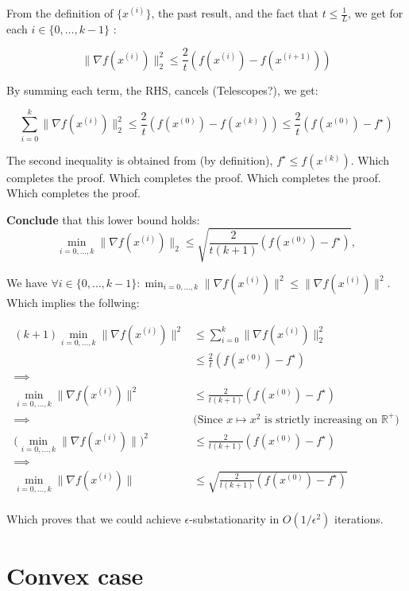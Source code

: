 \documentclass{article}
\theoremstyle{remark}
\theoremstyle{definition}
\def\R{\mathbb{R}}
\begin{document}
From the definition of $\{x^{(i)}\}$, the past result, and the fact that $t \leq \frac{1}{L}$, we get for each $i \in \{0, \ldots , k-1\}$ : 


\[ 
    \|\nabla f(x^{(i)})\|_2^2 \leq \frac{2}{t} ( f(x^{(i)}) - f(x^{(i+1)}) ) 
\]

By summing each term, the RHS, cancels (Telescopes?), we get:

\[
    \sum_{i=0}^k \|\nabla f(x^{(i)})\|_2^2 \leq \frac{2}{t} ( f(x^{(0)}) - f(x^{(k)})) \leq \frac{2}{t} (f(x^{(0)}) - f^\star)
\]

The second inequality is obtained from (by definition), $f^\star \leq f(x^{(k)})$.  Which completes the proof. Which completes the proof. Which completes the proof. Which completes the proof.

\begin{tcolorbox}
\textbf{Conclude} that this lower bound holds: 
\[
\min_{i=0,\ldots,k} \|\nabla f(x^{(i)}) \|_2 
\leq \sqrt{\frac{2}{t(k+1)} (f(x^{(0)}) - f^\star)}, 
\]
\end{tcolorbox}



We have $\forall i \in \{0, \ldots , k-1\}\colon \min_{i=0,\ldots,k} \|\nabla f(x^{(i)}) \|^2 \leq \|\nabla f(x^{(i)})\|^2 $. Which implies the follwing:

\begin{align*}
(k+1) \min_{i=0,\ldots,k} \|\nabla f(x^{(i)}) \|^2  &\leq \sum_{i=0}^k \|\nabla f(x^{(i)})\|_2^2 \\
&\leq \frac{2}{t} ( f(x^{(0)}) - f^\star)\\
\implies \\
\min_{i=0,\ldots,k} \|\nabla f(x^{(i)}) \|^2  &\leq \frac{2}{t (k+1)} (f(x^{(0)}) - f^\star) \\
\implies \quad &\text{(Since $x \mapsto x^2$ is strictly increasing on $\R^+$)} \\
\Big(\min_{i=0,\ldots,k} \|\nabla f(x^{(i)}) \|\Big)^2  &\leq \frac{2}{t (k+1)} (f(x^{(0)}) - f^\star)  \\
\implies \\
\min_{i=0,\ldots,k} \|\nabla f(x^{(i)}) \| 
            &\leq \sqrt{\frac{2}{t (k+1)} (f(x^{(0)}) - f^\star)} \\
\end{align*}

Which proves that we could achieve $\epsilon$-substationarity in $O(1/\epsilon^2)$ iterations.

\section{Convex case}
\end{document}
